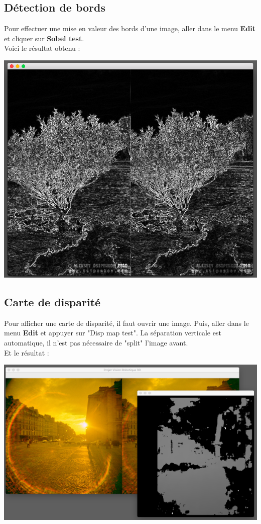 \documentclass[a4paper]{article}
\begin{document}
\subsection*{Détection de bords}

Pour effectuer une mise en valeur des bords d'une image, aller dans le menu
\textbf{Edit} et cliquer sur \textbf{Sobel test}. \\
Voici le résultat obtenu : \\[0.4cm]
\centerline{\includegraphics[width=\textwidth,height=\textheight,keepaspectratio]{img/4.png}}

\subsection*{Carte de disparité}

Pour afficher une carte de disparité, il faut ouvrir une image. Puis, aller dans
le menu \textbf{Edit} et appuyer sur "Disp map test". La séparation verticale est
automatique, il n'est pas nécessaire de "split" l'image avant. \\
Et le résultat : \\[0.4cm]
\centerline{\includegraphics[width=\textwidth,height=\textheight,keepaspectratio]{img/5.png}}
\end{document}
